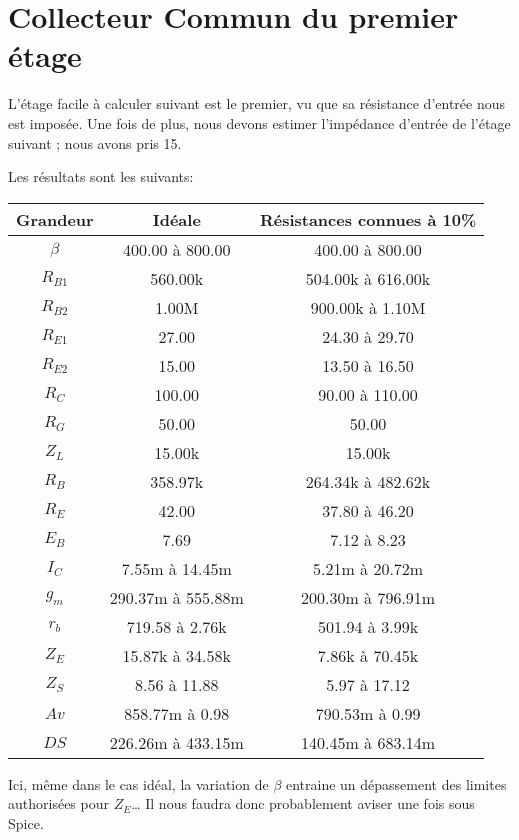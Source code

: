 \documentclass[11pt;a4paper]{report}
\begin{document}
  \section{Collecteur Commun du premier étage}
   L’étage facile à calculer suivant est le premier, vu que sa résistance d’entrée
   nous est imposée.
   Une fois de plus, nous devons estimer l’impédance d’entrée de l’étage suivant ; 
   nous avons pris 15\kilo\ohm.

   Les résultats sont les suivants:

   \begin{tabular}{|c|c|c|}
    \hline
 Grandeur  &       Idéale    &  Résistances connues à 10\% \\\hline
 $\beta$   & 400.00 à 800.00 & 400.00 à 800.00 \\\hline
 $R_{B1}$  &     560.00k      &504.00k à 616.00k\\\hline
 $R_{B2}$  &      1.00M       & 900.00k à 1.10M \\\hline
 $R_{E1}$  &      27.00       &  24.30 à 29.70  \\\hline
 $R_{E2}$  &      15.00       &  13.50 à 16.50  \\\hline
 $R_C$     &      100.00      & 90.00 à 110.00  \\\hline
 $R_G$     &      50.00       &      50.00       \\\hline
 $Z_L$     &      15.00k      &      15.00k      \\\hline
 $R_B$     &     358.97k      &264.34k à 482.62k\\\hline
 $R_E$     &      42.00       &  37.80 à 46.20  \\\hline
 $E_B$     &       7.69       &   7.12 à 8.23   \\\hline
 $I_C$     & 7.55m à 14.45m  & 5.21m à 20.72m  \\\hline
 $g_m$     &290.37m à 555.88m&200.30m à 796.91m\\\hline
 $r_b$     & 719.58 à 2.76k  & 501.94 à 3.99k  \\\hline
 $Z_E$     & 15.87k à 34.58k & 7.86k à 70.45k  \\\hline
 $Z_S$     &  8.56 à 11.88   &  5.97 à 17.12   \\\hline
 $Av$      & 858.77m à 0.98  & 790.53m à 0.99  \\\hline
 $DS$      &226.26m à 433.15m&140.45m à 683.14m\\\hline
\end{tabular}

    Ici, même dans le cas idéal, la variation de $\beta$ entraine un dépassement des
    limites authorisées pour $Z_E$… Il nous faudra donc probablement aviser une fois 
    sous Spice.
\end{document}
